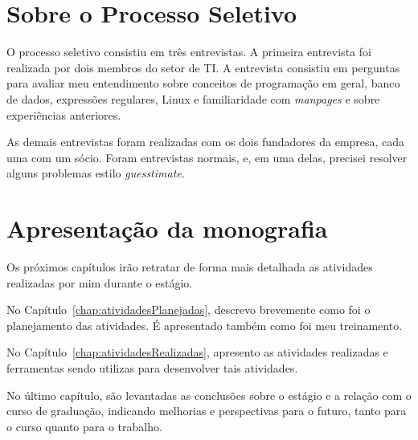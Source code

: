 \section{Sobre o Processo Seletivo}

O processo seletivo consistiu em três entrevistas. A primeira
entrevista foi realizada por dois membros do setor de TI. A entrevista
consistiu em perguntas para avaliar meu entendimento sobre
conceitos de programação em geral, banco de dados, expressões
regulares, Linux e familiaridade com \emph{manpages} e sobre experiências anteriores.

As demais entrevistas foram realizadas com os dois fundadores da
empresa, cada uma com um sócio. Foram entrevistas normais, e, em
uma delas, precisei resolver alguns problemas estilo
\textit{guesstimate}.


\section{Apresentação da monografia}

Os próximos capítulos irão retratar de forma mais detalhada as atividades realizadas por mim durante o estágio.

No Capítulo~\ref{chap:atividadesPlanejadas}, descrevo brevemente como foi o planejamento das atividades. É apresentado também
como foi meu treinamento.

No Capítulo~\ref{chap:atividadesRealizadas}, apresento as atividades realizadas e ferramentas sendo utilizas para desenvolver tais atividades. 

No último capítulo, são levantadas as conclusões sobre o estágio e a relação com 
o curso de graduação, indicando melhorias e perspectivas para o futuro, tanto para o curso 
quanto para o trabalho.


